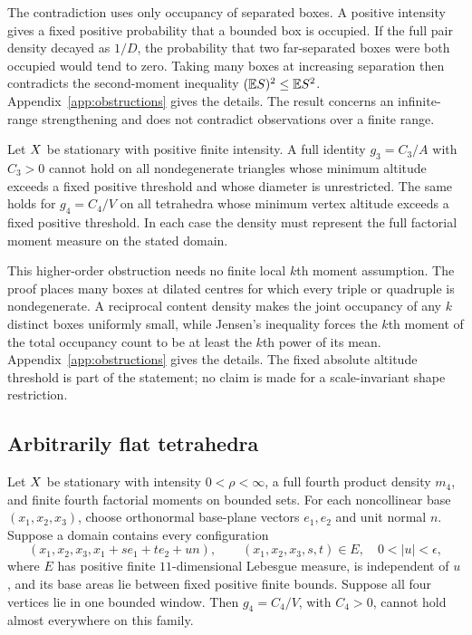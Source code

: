 The contradiction uses only occupancy of separated boxes. A positive intensity gives a fixed positive probability that a bounded box is occupied. If the full pair density decayed as $1/D$, the probability that two far-separated boxes were both occupied would tend to zero. Taking many boxes at increasing separation then contradicts the second-moment inequality $(\mathbb E S)^2\leq\mathbb E S^2$. Appendix~\ref{app:obstructions} gives the details. The result concerns an infinite-range strengthening and does not contradict observations over a finite range.

\begin{proposition}
\label{prop:higher-tail}
Let $X$ be stationary with positive finite intensity. A full identity $g_3=C_3/A$ with $C_3>0$ cannot hold on all nondegenerate triangles whose minimum altitude exceeds a fixed positive threshold and whose diameter is unrestricted. The same holds for $g_4=C_4/V$ on all tetrahedra whose minimum vertex altitude exceeds a fixed positive threshold. In each case the density must represent the full factorial moment measure on the stated domain.
\end{proposition}

This higher-order obstruction needs no finite local $k$th moment assumption. The proof places many boxes at dilated centres for which every triple or quadruple is nondegenerate. A reciprocal content density makes the joint occupancy of any $k$ distinct boxes uniformly small, while Jensen's inequality forces the $k$th moment of the total occupancy count to be at least the $k$th power of its mean. Appendix~\ref{app:obstructions} gives the details. The fixed absolute altitude threshold is part of the statement; no claim is made for a scale-invariant shape restriction.

\subsection{Arbitrarily flat tetrahedra}

\begin{proposition}
\label{prop:flat}
Let $X$ be stationary with intensity $0<\rho<\infty$, a full fourth product density $m_4$, and finite fourth factorial moments on bounded sets. For each noncollinear base $(x_1,x_2,x_3)$, choose orthonormal base-plane vectors $e_1,e_2$ and unit normal $n$. Suppose a domain contains every configuration
\[
 (x_1,x_2,x_3,x_1+s e_1+t e_2+u n),\qquad
 (x_1,x_2,x_3,s,t)\in E,\quad 0<|u|<\epsilon,
\]
where $E$ has positive finite $11$-dimensional Lebesgue measure, is independent of $u$, and its base areas lie between fixed positive finite bounds. Suppose all four vertices lie in one bounded window. Then $g_4=C_4/V$, with $C_4>0$, cannot hold almost everywhere on this family.
\end{proposition}


